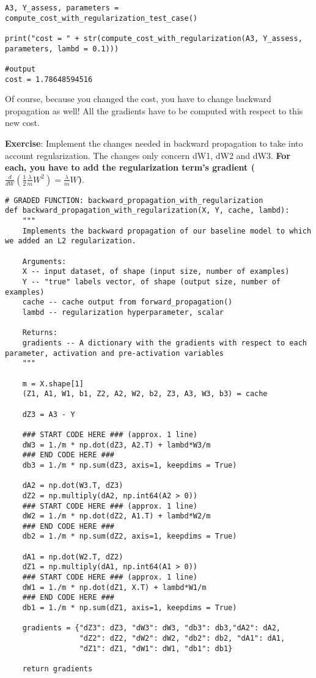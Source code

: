 \begin{verbatim}
A3, Y_assess, parameters = compute_cost_with_regularization_test_case()

print("cost = " + str(compute_cost_with_regularization(A3, Y_assess, parameters, lambd = 0.1)))

#output
cost = 1.78648594516
\end{verbatim}


Of course, because you changed the cost, you have to change backward propagation as well! All the gradients have to be computed with respect to this new cost. 

{\textbf {Exercise}}: Implement the changes needed in backward propagation to take into account regularization. The changes only concern dW1, dW2 and dW3.{\textbf { For each, you have to add the regularization term's gradient ($\frac{d}{dW} ( \frac{1}{2}\frac{\lambda}{m}  W^2) = \frac{\lambda}{m} W$)}}.

\begin{verbatim}
# GRADED FUNCTION: backward_propagation_with_regularization
def backward_propagation_with_regularization(X, Y, cache, lambd):
    """
    Implements the backward propagation of our baseline model to which we added an L2 regularization.
    
    Arguments:
    X -- input dataset, of shape (input size, number of examples)
    Y -- "true" labels vector, of shape (output size, number of examples)
    cache -- cache output from forward_propagation()
    lambd -- regularization hyperparameter, scalar
    
    Returns:
    gradients -- A dictionary with the gradients with respect to each parameter, activation and pre-activation variables
    """
    
    m = X.shape[1]
    (Z1, A1, W1, b1, Z2, A2, W2, b2, Z3, A3, W3, b3) = cache
    
    dZ3 = A3 - Y
    
    ### START CODE HERE ### (approx. 1 line)
    dW3 = 1./m * np.dot(dZ3, A2.T) + lambd*W3/m
    ### END CODE HERE ###
    db3 = 1./m * np.sum(dZ3, axis=1, keepdims = True)
    
    dA2 = np.dot(W3.T, dZ3)
    dZ2 = np.multiply(dA2, np.int64(A2 > 0))
    ### START CODE HERE ### (approx. 1 line)
    dW2 = 1./m * np.dot(dZ2, A1.T) + lambd*W2/m
    ### END CODE HERE ###
    db2 = 1./m * np.sum(dZ2, axis=1, keepdims = True)
    
    dA1 = np.dot(W2.T, dZ2)
    dZ1 = np.multiply(dA1, np.int64(A1 > 0))
    ### START CODE HERE ### (approx. 1 line)
    dW1 = 1./m * np.dot(dZ1, X.T) + lambd*W1/m
    ### END CODE HERE ###
    db1 = 1./m * np.sum(dZ1, axis=1, keepdims = True)
    
    gradients = {"dZ3": dZ3, "dW3": dW3, "db3": db3,"dA2": dA2,
                 "dZ2": dZ2, "dW2": dW2, "db2": db2, "dA1": dA1, 
                 "dZ1": dZ1, "dW1": dW1, "db1": db1}
    
    return gradients
\end{verbatim}

